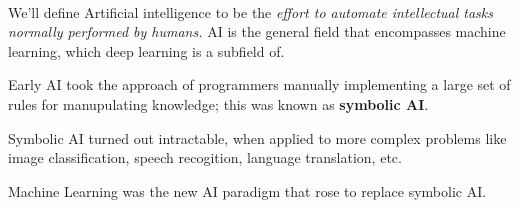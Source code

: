 \documentclass[12pt, a4paper]{article}
\begin{document}
\paragraph*{}
We'll define Artificial intelligence to be the \textit{effort to automate intellectual 
tasks normally performed by humans.} AI is the general field that encompasses machine learning,
which deep learning is a subfield of.

Early AI took the approach of programmers manually implementing a large set of 
rules for manupulating knowledge; this was known as \textbf{symbolic AI}.

Symbolic AI turned out intractable, when applied to more complex problems like
image classification, speech recogition, language translation, etc.

Machine Learning was the new AI paradigm that rose to replace symbolic AI.
\end{document}
